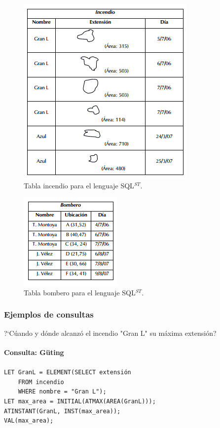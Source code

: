 \documentclass[a4paper,12pt,oneside]{report}
\begin{document}
\begin{figure}[h]
\centering
\includegraphics[scale=0.6]{images/tablaincendiosqlts.png}
\caption{Tabla incendio para el lenguaje SQL$^{ST}$.}
\end{figure}

\begin{figure}[h]
\centering
\includegraphics[scale=0.6]{images/tablabomberosqlts.png}
\caption{Tabla bombero para el lenguaje SQL$^{ST}$.}
\end{figure}

\subsubsection*{Ejemplos de consultas}
?`C\'uando y d\'onde alcanz\'o el incendio "Gran L" su m\'axima extensi\'on?\\
\ \\
\textbf{Consulta: G\"uting}\\
\ \\
\texttt{LET GranL = ELEMENT(SELECT extensi\'on\\
\ \ \ \ FROM incendio\\
\ \ \ \ WHERE nombre = "Gran L");\\
LET max\_area = INITIAL(ATMAX(AREA(GranL)));\\
ATINSTANT(GranL, INST(max\_area));\\
VAL(max\_area);}
\end{document}
